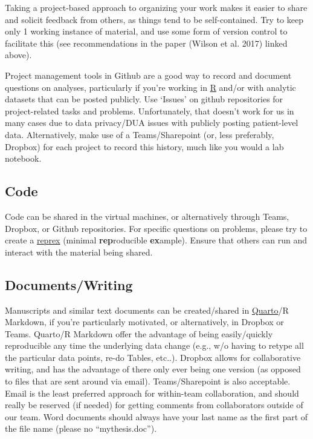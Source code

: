 \documentclass[
  letterpaper,
  DIV=11,
  numbers=noendperiod]{scrreprt}
\begin{document}
Taking a project-based approach to organizing your work makes it easier
to share and solicit feedback from others, as things tend to be
self-contained. Try to keep only 1 working instance of material, and use
some form of version control to facilitate this (see recommendations in
the paper (Wilson et al. 2017) linked above).

Project management tools in Github are a good way to record and document
questions on analyses, particularly if you're working in
\href{https://cran.r-project.org/}{R} and/or with analytic datasets that
can be posted publicly. Use `Issues' on github repositories for
project-related tasks and problems. Unfortunately, that doesn't work for
us in many cases due to data privacy/DUA issues with publicly posting
patient-level data. Alternatively, make use of a Teams/Sharepoint (or,
less preferably, Dropbox) for each project to record this history, much
like you would a lab notebook.

\hypertarget{code}{%
\subsection{Code}\label{code}}

Code can be shared in the virtual machines, or alternatively through
Teams, Dropbox, or Github repositories. For specific questions on
problems, please try to create a
\href{https://reprex.tidyverse.org/}{reprex} (minimal
\textbf{rep}roducible \textbf{ex}ample). Ensure that others can run and
interact with the material being shared.

\hypertarget{documentswriting}{%
\subsection{Documents/Writing}\label{documentswriting}}

Manuscripts and similar text documents can be created/shared in
\href{https://quarto.org/}{Quarto}/R Markdown, if you're particularly
motivated, or alternatively, in Dropbox or Teams. Quarto/R Markdown
offer the advantage of being easily/quickly reproducible any time the
underlying data change (e.g., w/o having to retype all the particular
data points, re-do Tables, etc..). Dropbox allows for collaborative
writing, and has the advantage of there only ever being one version (as
opposed to files that are sent around via email). Teams/Sharepoint is
also acceptable. Email is the least preferred approach for within-team
collaboration, and should really be reserved (if needed) for getting
comments from collaborators outside of our team. Word documents should
always have your last name as the first part of the file name (please no
``mythesis.doc'').
\end{document}
